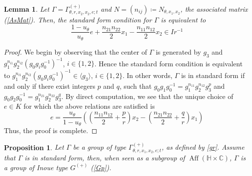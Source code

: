 \documentclass[12pt]{amsart}
\newtheorem{lemma}{Lemma}[section]
\newtheorem{proposition}{Proposition}[section]
\newcommand{\C}{\mathbb{C}}
\newcommand{\HH}{\mathbb{H}}
\DeclareMathOperator{\Aff}{Aff}
\begin{document}
\begin{lemma} \label{sf}
 Let $\Gamma =\Gamma_{\theta,r,x_2,x_2,e;t}^{(+)}$ and $N = (n_{ij})\coloneq N_{\theta, x_1,x_2}$, the associated matrix (\ref{AsMat}). Then, the standard form condition for $\Gamma$ is equivalent to 
\begin{equation}\label{sfl}
\frac{1-u_\theta}{u_\theta}e + \frac{n_{21}n_{22}}{2}x_1-\frac{n_{11}n_{12}}{2}x_2 \in Ir^{-1}
\end{equation}
\end{lemma}
\begin{proof}
We begin by observing that the center of $\Gamma$ is generated by $g_3$ and $g_1^{n_{i1}}g_2^{n_{i2}}(g_0 g_ig_0^{-1})^{-1}$, $i\in \{1,2\}$. Hence the standard form condition is equivalent to $g_1^{n_{i1}}g_2^{n_{i2}}(g_0 g_ig_0^{-1})^{-1} \in \langle g_3 \rangle$, $i \in \{1,2\}$. In other words, $\Gamma$ is in standard form if and only if there exist integers $p$ and $q$, such that $g_0g_1g_0^{-1}= g_1^{n_{11}}g_2^{n_{12}}g_3^{p}$ and $g_0g_2g_0^{-1}= g_1^{n_{21}}g_2^{n_{22}}g_3^{q}$. By direct computation, we see that the unique choice of $e \in K$ for which the above relations are satisfied is 
\begin{equation}\label{ee}
e=\frac{u_\theta}{1-u_\theta}\left(\left(\frac{n_{11}n_{12}}{2}+\frac{p}{r}\right)x_2-\left(\frac{n_{21}n_{22}}{2}+\frac{q}{r}\right)x_1\right)
\end{equation} 
Thus, the proof is complete.
\end{proof}

\begin{proposition} \label{p1}
Let $\Gamma$ be a group of type $\Gamma_{\theta, r,x_1,x_2,e;t}^{(+)}$, as defined by \ref{gr}. Assume that $\Gamma$ is in standard form, then, when seen as a subgroup of $\Aff(\HH \times \C)$, $\Gamma$ is a group of Inoue type $G^{(+)}$ (\ref{Gp}).
\end{proposition}
\end{document}
